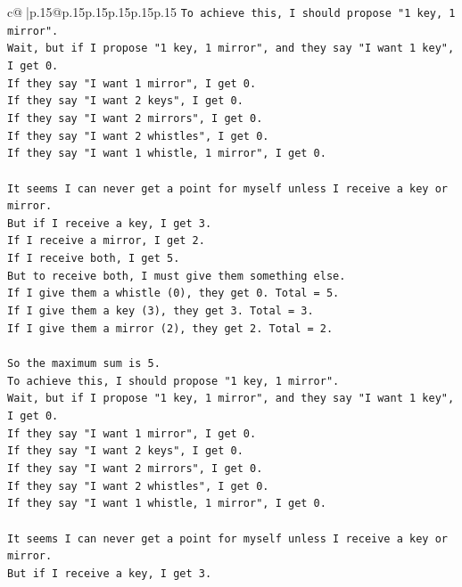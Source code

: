 \documentclass{article}
\begin{document}
{\begin{supertabular}{c@{$\;$}|p{.15\linewidth}@{}p{.15\linewidth}p{.15\linewidth}p{.15\linewidth}p{.15\linewidth}p{.15\linewidth}}
{{{\texttt{To achieve this, I should propose "1 key, 1 mirror".} \\
\texttt{Wait, but if I propose "1 key, 1 mirror", and they say "I want 1 key", I get 0.} \\
\texttt{If they say "I want 1 mirror", I get 0.} \\
\texttt{If they say "I want 2 keys", I get 0.} \\
\texttt{If they say "I want 2 mirrors", I get 0.} \\
\texttt{If they say "I want 2 whistles", I get 0.} \\
\texttt{If they say "I want 1 whistle, 1 mirror", I get 0.} \\
\\ 
\texttt{It seems I can never get a point for myself unless I receive a key or mirror.} \\
\texttt{But if I receive a key, I get 3.} \\
\texttt{If I receive a mirror, I get 2.} \\
\texttt{If I receive both, I get 5.} \\
\texttt{But to receive both, I must give them something else.} \\
\texttt{If I give them a whistle (0), they get 0. Total = 5.} \\
\texttt{If I give them a key (3), they get 3. Total = 3.} \\
\texttt{If I give them a mirror (2), they get 2. Total = 2.} \\
\\ 
\texttt{So the maximum sum is 5.} \\
\texttt{To achieve this, I should propose "1 key, 1 mirror".} \\
\texttt{Wait, but if I propose "1 key, 1 mirror", and they say "I want 1 key", I get 0.} \\
\texttt{If they say "I want 1 mirror", I get 0.} \\
\texttt{If they say "I want 2 keys", I get 0.} \\
\texttt{If they say "I want 2 mirrors", I get 0.} \\
\texttt{If they say "I want 2 whistles", I get 0.} \\
\texttt{If they say "I want 1 whistle, 1 mirror", I get 0.} \\
\\ 
\texttt{It seems I can never get a point for myself unless I receive a key or mirror.} \\
\texttt{But if I receive a key, I get 3.} \\
}}}
\end{supertabular}}
\end{document}
